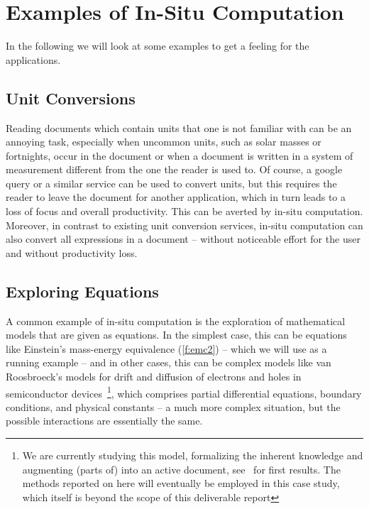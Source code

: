 \section{Examples of In-Situ Computation}\label{sec:examples}

In the following we will look at some examples to get a feeling for the applications.

\subsection{Unit Conversions}\label{sec:ex:units}
Reading documents which contain units that one is not familiar with can be an annoying
task, especially when uncommon units, such as solar masses or fortnights, occur in the
document or when a document is written in a system of measurement different from the one
the reader is used to.  Of course, a google query or a similar service can be used to
convert units, but this requires the reader to leave the document for another application,
which in turn leads to a loss of focus and overall productivity.  This can be averted by
in-situ computation. Moreover, in contrast to existing unit conversion services, in-situ
computation can also convert all expressions in a document -- without noticeable effort
for the user and without productivity loss.


\subsection{Exploring Equations}\label{sec:ex:equations}

A common example of in-situ computation is the exploration of mathematical models that are
given as equations. In the simplest case, this can be equations like Einstein's
mass-energy equivalence (\ref{f:emc2}) -- which we will use as a running example -- and in
other cases, this can be complex models like van Roosbroeck's models for drift and
diffusion of electrons and holes in semiconductor devices~\cite{FarRotDoa:nmddm16}\footnote{We
  are currently studying this model, formalizing the inherent knowledge and augmenting
  (parts of) \cite{FarRotDoa:nmddm16} into an active document, see~\cite{KohKopMueTab:RCS} for
  first results. The methods reported on here will eventually be employed in this case
  study, which itself is beyond the scope of this deliverable report}, which comprises
partial differential equations, boundary conditions, and physical constants -- a much more
complex situation, but the possible interactions are essentially the same.


